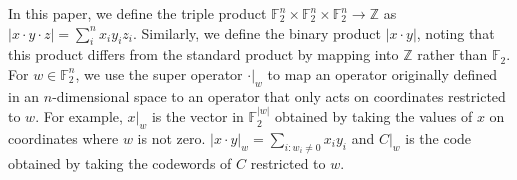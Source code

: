 \documentclass[manuscript,screen,review]{acmart}
\begin{document}
{In this paper, we define the triple product $\mathbb{F}_2^{n}\times \mathbb{F}_2^{n}\times\mathbb{F}_2^{n} \rightarrow \mathbb{Z}$ as $|x\cdot y \cdot z| = \sum_{i}^{n}{x_{i}y_{i}z_{i}}$. Similarly, we define the binary product $|x \cdot y|$, noting that this product differs from the standard product by mapping into $\mathbb{Z}$ rather than $\mathbb{F}_{2}$. For $w \in \mathbb{F}_{2}^{n}$, we use the super operator $ \cdot |_{w} $ to map an operator originally defined in an $n$-dimensional space to an operator that only acts on coordinates restricted to $w$. For example, $x|_{w}$ is the vector in $\mathbb{F}_{2}^{|w|}$ obtained by taking the values of $x$ on coordinates where $w$ is not zero. $|x\cdot y|_{w} = \sum_{i:w_{i}\neq 0}{x_{i}y_{i}}$ and $C|_{w}$ is the code obtained by taking the codewords of $C$ restricted to $w$.




}
\end{document}
